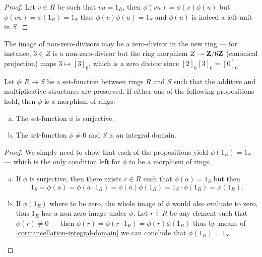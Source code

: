 %
\begin{proof}
Let \(v \in R\) be such that \(v u = 1_R\), then \(\phi(v u) = \phi(v) \phi(u)\)
but \(\phi(v u) = \phi(1_R) = 1_S\) thus \(\phi(v) \phi(u) = 1_S\) and
\(\phi(u)\) is indeed a left-unit in \(S\).
\end{proof}
%

%
\begin{remark}
\label{rem:non-zero-divisors-may-not-be-preserved}
The image of non-zero-divisors may be a zero-divisor in the new ring --- for
instance, \(3 \in Z\) is a non-zero-divisor but the ring morphism
\(Z \twoheadrightarrow \mathbf{Z}/6\mathbf{Z}\) (canonical projection) maps \(3 \mapsto [3]_6\), which is a
zero divisor since \([2]_6 [3]_6 = [0]_6\).
\end{remark}
%

%
\begin{proposition}
\label{prop:sufficient-conditions-morphism-of-rings}
Let \(\phi: R \to S\) be a set-function between rings \(R\) and \(S\) such that
the additive and multiplicative structures are preserved. If either one of the
following propositions hold, then \(\phi\) is a morphism of rings:
\begin{enumerate}[(a)]\setlength\itemsep{0em}
\item The set-function \(\phi\) is surjective.

\item The set-function \(\phi \neq 0\) and \(S\) is an integral domain.
\end{enumerate}
\end{proposition}
%

%
\begin{proof}
We simply need to show that each of the propositions yield \(\phi(1_R) = 1_S\)
--- which is the only condition left for \(\phi\) to be a morphism of rings.
\begin{enumerate}[(a)]\setlength\itemsep{0em}
\item If \(\phi\) is surjective, then there exists \(r \in R\) such that
  \(\phi(a) = 1_S\) but then
  \[
  1_S = \phi(a) = \phi(a \cdot 1_R) = \phi(a) \phi(1_R)
  = 1_S \cdot \phi(1_R) = \phi(1_R).
  \]

\item If \(\phi(1_R)\) where to be zero, the whole image of \(\phi\) would also
  evaluate to zero, thus \(1_R\) has a non-zero image under \(\phi\). Let
  \(r \in R\) be any element such that \(\phi(r) \neq 0\) --- then
  \(\phi(r) = \phi(r \cdot 1_R) = \phi(r) \phi(1_R)\) thus by means of
  \cref{cor:cancellation-integral-domain} we can conclude that
  \(\phi(1_R) = 1_S\).
\end{enumerate}
\end{proof}
%


